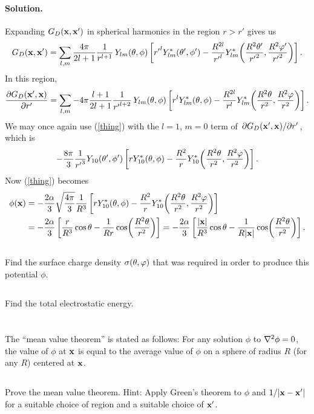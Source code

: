 \documentclass[11pt]{article}
\newcommand{\vfix}{\vspace{-\baselineskip}}
\newcommand{\refeq}[1]{(\ref{#1})}
\newcommand{\beq}{\begin{equation*}}
\newcommand{\eeq}{\end{equation*}}
\newenvironment{statement}[1]
{
	\section{#1}
	\color{darkgray}
	\ignorespaces
}
{
}
\newenvironment{problem}
{
	\subsection{}
	\color{darkgray}
    \ignorespaces
}
{

}
\newenvironment{solution}
{
    \paragraph{Solution.}
    \ignorespaces
}
{
    \bigskip
}
\begin{document}
\begin{solution}
	Expanding $G_D(\mathbf{x}, \mathbf{x}')$ in spherical harmonics in the region $r > r'$ gives us
	\beq
		\Gdxxp = \sum_{l,m} \frac{4\pi}{2l + 1} \frac{1}{r^{l+1}} \, \Ylm\tv \left[ {r'}^l \Ylm^*\tvp - \frac{R^{2l}}{{r'}^l} \Ylm^*\!\left( \frac{R^2 \tht'}{{r'}^2}, \frac{R^2 \vph'}{{r'}^2} \right) \right].
	\eeq
	In this region,
	\beq
		\pdv{\Gdxpx}{r'} = \sum_{l,m} -4\pi \frac{l + 1}{2l + 1} \frac{1}{{r'}^{l+2}} \, \Ylm\tv \left[ r^l \Ylm^*\tv - \frac{R^{2l}}{r^l} \Ylm^*\!\left( \frac{R^2 \tht}{r^2}, \frac{R^2 \vph}{r^2} \right) \right].
	\eeq
	We may once again use \refeq{thing} with the $l = 1$, $m = 0$ term of $\pdv*{G_D(\mathbf{x}', \mathbf{x})}{r'}$, which is
	\beq
		-\frac{8\pi}{3} \frac{1}{{r'}^3} Y_{1 0}\tvp \left[ r Y_{1 0}^*\tv - \frac{R^2}{r} Y_{1 0}^*\!\left( \frac{R^2 \tht}{r^2}, \frac{R^2 \vph}{r^2} \right) \right].
	\eeq
	Now \refeq{thing} becomes
	\begin{align*}
		\phi(\mathbf{x}) &= -\frac{2\alpha}{3} \sqrt{\frac{4\pi}{3}} \frac{1}{R^3} \left[ r Y_{1 0}^*(\theta, \phi) - \frac{R^2}{r} Y_{1 0}^*\!\left( \frac{R^2 \theta}{r^2}, \frac{R^2 \varphi}{r^2} \right) \right] \\
		&= -\frac{2\alpha}{3} \left[ \frac{r}{R^3} \cos\theta - \frac{1}{R r} \cos(\frac{R^2 \theta}{r^2}) \right]
		= -\frac{2\alpha}{3} \left[ \frac{\abs{\mathbf{x}}}{R^3} \cos\theta - \frac{1}{R \abs{\mathbf{x}}} \cos(\frac{R^2 \theta}{r^2}) \right].
	\end{align*}
\end{solution}
\vfix


\begin{problem}
	Find the surface charge density $\sigma(\theta, \varphi)$ that was required in order to produce this potential $\phi$.
\end{problem}

\begin{problem}
	Find the total electrostatic energy.
\end{problem}







\begin{statement}{}
	The ``mean value theorem'' is stated as follows: For any solution $\phi$ to $\nabla^2 \phi = 0$, the value of $\phi$ at $\mathbf{x}$ is equal to the average value of $\phi$ on a sphere of radius $R$ (for any $R$) centered at $\mathbf{x}$.
\end{statement}

\begin{problem}
	Prove the mean value theorem.  Hint: Apply Green's theorem to $\phi$ and $1/\abs{\mathbf{x} - \mathbf{x}'}$ for a suitable choice of region and a suitable choice of $\mathbf{x}'$.
\end{problem}
\end{document}
